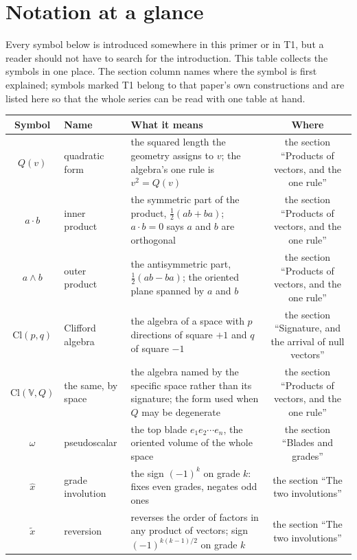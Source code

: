 \documentclass[11pt]{article}
\theoremstyle{definition}
\theoremstyle{plain}
\providecommand{\Cl}{}\renewcommand{\Cl}{\mathrm{Cl}}
\begin{document}
\section{Notation at a glance}

\label{c:note.primer.setting-notation-glance}
Every symbol below is introduced somewhere in this primer or in T1, but a reader should not have to search for the introduction. This table collects the symbols in one place. The section column names where the symbol is first explained; symbols marked T1 belong to that paper's own constructions and are listed here so that the whole series can be read with one table at hand.

\begin{center}
 \begin{tabular}{cl>{ \arraybackslash}p{7.0cm}c}
\toprule
Symbol & Name & What it means & Where \\
\midrule
$Q(v)$ & quadratic form & the squared length the geometry assigns to $v$; the algebra's one rule is $v^2 = Q(v)$ & the section ``Products of vectors, and the one rule'' \\
$a \cdot b$ & inner product & the symmetric part of the product, $\tfrac12(ab + ba)$; $a \cdot b = 0$ says $a$ and $b$ are orthogonal & the section ``Products of vectors, and the one rule'' \\
$a \wedge b$ & outer product & the antisymmetric part, $\tfrac12(ab - ba)$; the oriented plane spanned by $a$ and $b$ & the section ``Products of vectors, and the one rule'' \\
$\Cl(p,q)$ & Clifford algebra & the algebra of a space with $p$ directions of square $+1$ and $q$ of square $-1$ & the section ``Signature, and the arrival of null vectors'' \\
$\Cl(\mathbb{V}, Q)$ & the same, by space & the algebra named by the specific space rather than its signature; the form used when $Q$ may be degenerate & the section ``Products of vectors, and the one rule'' \\
$\omega$ & pseudoscalar & the top blade $e_1 e_2 \cdots e_n$, the oriented volume of the whole space & the section ``Blades and grades'' \\
$\hat{x}$ & grade involution & the sign $(-1)^k$ on grade $k$: fixes even grades, negates odd ones & the section ``The two involutions'' \\
$\tilde{x}$ & reversion & reverses the order of factors in any product of vectors; sign $(-1)^{k(k-1)/2}$ on grade $k$ & the section ``The two involutions'' \\

\end{tabular}
\end{center}
\end{document}

